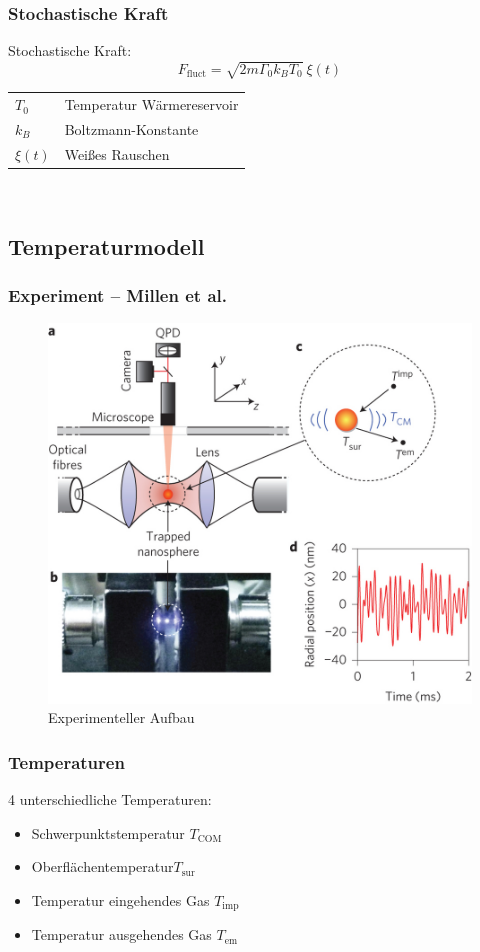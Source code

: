 \documentclass[handout]{beamer}
\begin{document}
\begin{frame}
\frametitle{Stochastische Kraft}
Stochastische Kraft:
\begin{equation}
    \label{eq:ffluct}
    F_\text{fluct} = \sqrt{2m\Gamma_0k_BT_0} \ \xi\left(t\right)
\end{equation}
\begin{tabular}{l l}
$T_0$ & Temperatur Wärmereservoir\\
$k_B$ & Boltzmann-Konstante\\
$\xi(t)$ & Weißes Rauschen\\
\end{tabular}\\
\end{frame}


\subsection{Temperaturmodell}
\begin{frame}
\frametitle{Experiment -- Millen et al.}
\begin{center}
\begin{figure}
\includegraphics[scale=0.2]{../images/nnano_millen.jpg}
\caption{Experimenteller Aufbau \cite{MillenJ.2014}}
\end{figure}
\end{center}
\end{frame}

\begin{frame}
\frametitle{Temperaturen}
4 unterschiedliche Temperaturen:
\begin{itemize}
\item Schwerpunktstemperatur $T_\text{COM}$
\item Oberflächentemperatur$T_\text{sur}$
\item Temperatur eingehendes Gas $T_\text{imp}$
\item Temperatur ausgehendes Gas $T_\text{em}$
\end{itemize}
\end{frame}
\end{document}
